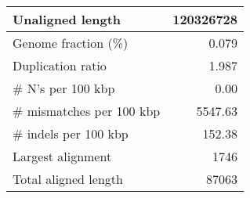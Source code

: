 \documentclass[12pt,a4paper]{article}
\begin{document}
\begin{table}[ht]
\begin{center}
\begin{tabular}{|l*{1}{|r}|}
Unaligned length & 120326728 \\ \hline
Genome fraction (\%) & 0.079 \\ \hline
Duplication ratio & 1.987 \\ \hline
\# N's per 100 kbp & 0.00 \\ \hline
\# mismatches per 100 kbp & 5547.63 \\ \hline
\# indels per 100 kbp & 152.38 \\ \hline
Largest alignment & 1746 \\ \hline
Total aligned length & 87063 \\ \hline
\end{tabular}
\end{center}
\end{table}
\end{document}
